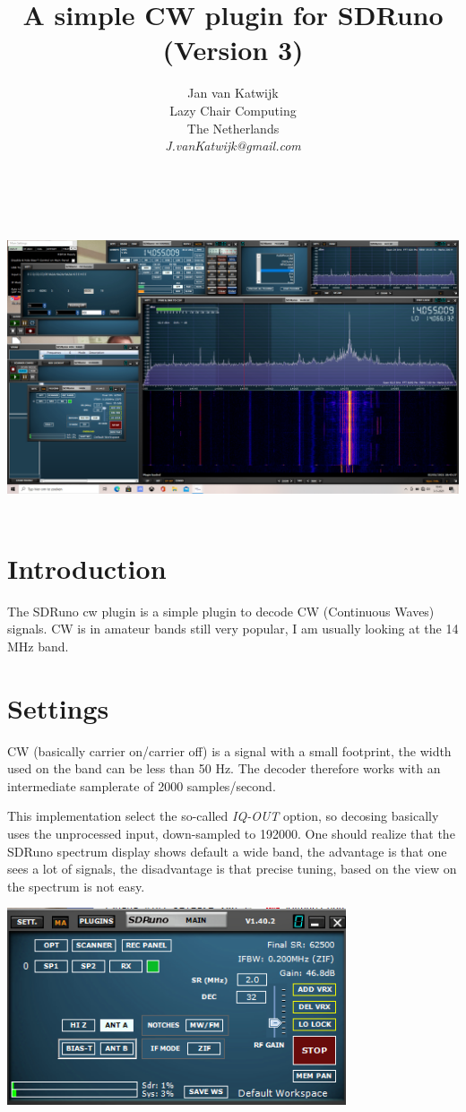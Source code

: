 \documentclass[11pt]{article}
\begin{document}
\title{A simple CW plugin for SDRuno (Version 3)}
\author{
Jan van Katwijk\\
Lazy Chair Computing \\
The Netherlands\\
{\em J.vanKatwijk@gmail.com}}
\maketitle
\ \\
\ \\
\includegraphics[width=140mm]{cw-example.png}
\ \\
\section{Introduction}
The SDRuno cw plugin is a simple plugin to decode CW (Continuous Waves) signals.
CW is in amateur bands still very popular, I am usually looking at the
14 MHz band. 

\section{Settings}
CW (basically carrier on/carrier off) is a signal with a small footprint,
the width used on  the band can be less than 50 Hz.
The decoder therefore works with an intermediate
samplerate of 2000 samples/second.
\par
This implementation select the so-called {\em IQ-OUT} option, so
decosing basically uses the unprocessed input, down-sampled to 192000.
One should realize that the SDRuno spectrum display shows default a
wide band, the advantage is that one sees a lot of signals, the disadvantage
is that precise tuning, based on the view on the spectrum is not easy.

\includegraphics[width=100mm]{main-widget.png}
\end{document}
